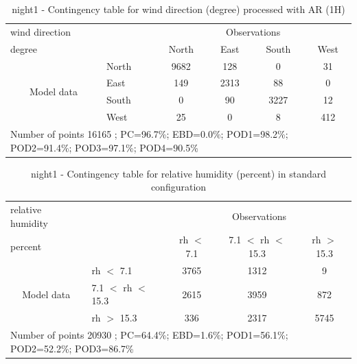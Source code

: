 \begin{table}[p!]
\begin{center}
\begin{tabular}{llcccc}
\hline
{wind direction}                                       &                                                    & \multicolumn{4}{c}{Observations}                 \\
{degree}                                       &                             & {North}   & {East} & {South} & {West} \\
\hline
\multicolumn{1}{c}{\multirow{4}{*}{Model data}}  & {North}              & 9682                & 128                       & 0              & 31\\
                                                 & {East}               & 149                & 2313                       & 88              & 0\\
                                                 & {South}              & 0                & 90                      & 3227             & 12\\
                                                 & {West}               & 25               & 0                      & 8             & 412\\
\hline 
\multicolumn{6}{l}{ Number of points        16165 ; PC=96.7\%; EBD=0.0\%; POD1=98.2\%; POD2=91.4\%; POD3=97.1\%; POD4=90.5\%}                 \\
\end{tabular}
\end{center}
\caption{night1 - Contingency table for {wind direction} (degree) processed with AR (1H)}
\label{tab:contingencywdAFT:night1}
\end{table}
\begin{table}[p!]
\begin{center}
\begin{tabular}{llccc}
\hline
{relative humidity}                                       &                                                    & \multicolumn{3}{c}{Observations}                 \\
{percent}                                       &                             & rh $<$ 7.1   & 7.1 $<$ rh $<$ 15.3 & rh $>$ 15.3 \\
\hline
\multicolumn{1}{c}{\multirow{3}{*}{Model data}}  & rh $<$ 7.1             & 3765                & 1312                       & 9              \\
                                                 & 7.1  $<$ rh $<$ 15.3 & 2615                & 3959                       & 872              \\
                                                 & rh $>$ 15.3             & 336                & 2317                       & 5745              \\
\hline
\multicolumn{5}{l}{ Number of points        20930 ; PC=64.4\%; EBD=1.6\%; POD1=56.1\%; POD2=52.2\%; POD3=86.7\%}
\end{tabular}
\end{center}
\caption{night1 - Contingency table for  relative humidity (percent) in standard configuration}
\label{tab:contingencyrhBEF:night1}
\end{table}
